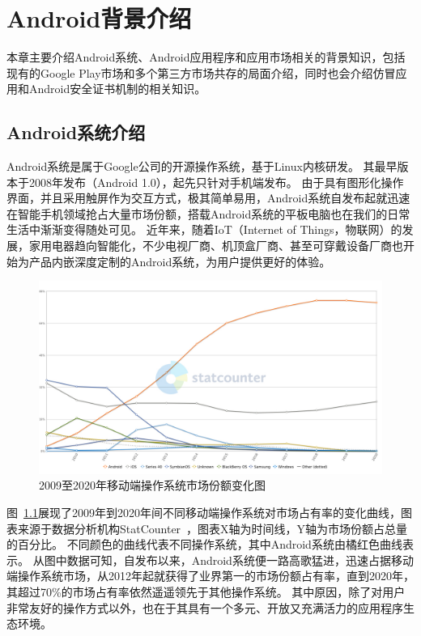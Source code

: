 \chapter{Android背景介绍}
\label{chp:background}

本章主要介绍Android系统、Android应用程序和应用市场相关的背景知识，包括现有的Google Play市场和多个第三方市场共存的局面介绍，同时也会介绍仿冒应用和Android安全证书机制的相关知识。

\section{Android系统介绍}
Android系统是属于Google公司的开源操作系统，基于Linux内核研发。
其最早版本于2008年发布（Android 1.0），起先只针对手机端发布。
由于具有图形化操作界面，并且采用触屏作为交互方式，极其简单易用，Android系统自发布起就迅速在智能手机领域抢占大量市场份额，搭载Android系统的平板电脑也在我们的日常生活中渐渐变得随处可见。
近年来，随着IoT（Internet of Things，物联网）的发展，家用电器趋向智能化，不少电视厂商、机顶盒厂商、甚至可穿戴设备厂商也开始为产品内嵌深度定制的Android系统，为用户提供更好的体验。

\begin{figure}
	\centering
	\includegraphics[width=\textwidth]{./Figures/edwin-StatCounter-os-mkt-share-yearly-2009-2020.jpg}
	\caption{2009至2020年移动端操作系统市场份额变化图}
	\label{fig:Android-Mkt-Share}
\end{figure}

图~\ref{fig:Android-Mkt-Share}展现了2009年到2020年间不同移动端操作系统对市场占有率的变化曲线，图表来源于数据分析机构StatCounter~\cite{MobileOSMktShare}，图表X轴为时间线，Y轴为市场份额占总量的百分比。
不同颜色的曲线代表不同操作系统，其中Android系统由橘红色曲线表示。
从图中数据可知，自发布以来，Android系统便一路高歌猛进，迅速占据移动端操作系统市场，从2012年起就获得了业界第一的市场份额占有率，直到2020年，其超过70\%的市场占有率依然遥遥领先于其他操作系统。
其中原因，除了对用户非常友好的操作方式以外，也在于其具有一个多元、开放又充满活力的应用程序生态环境。

